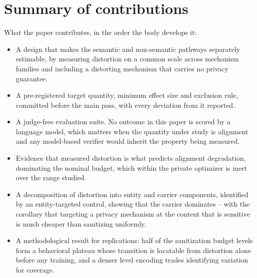 \section{\label{apx:contrib}Summary of contributions}
What the paper contributes,
in the order the body develops it:

\begin{itemize}
  \item A design that makes the semantic and non-semantic pathways separately estimable,
  by measuring distortion on a common scale across mechanism families and including a distorting mechanism that carries no privacy guarantee.
  \item A pre-registered target quantity,
  minimum effect size and exclusion rule,
  committed before the main pass,
  with every deviation from it reported.
  \item A judge-free evaluation suite.
  No outcome in this paper is scored by a language model,
  which matters when the quantity under study is alignment and any model-based verifier would inherit the property being measured.
  \item Evidence that measured distortion is what predicts alignment degradation,
  dominating the nominal budget,
  which within the private optimizer is inert over the range studied.
  \item A decomposition of distortion into entity and carrier components,
  identified by an entity-targeted control,
  showing that the carrier dominates -- with the corollary that targeting a privacy mechanism at the content that is sensitive is much cheaper than sanitizing uniformly.
  \item A methodological result for replications:
  half of the sanitization budget levels form a behavioral plateau whose transition is locatable from distortion alone before any training,
  and a denser level encoding trades identifying variation for coverage.
\end{itemize}
